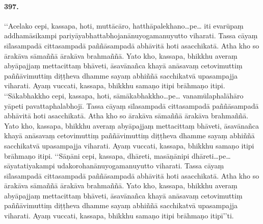 \paragraph{397.} ‘‘Acelako cepi, kassapa, hoti, muttācāro, hatthāpalekhano…pe… iti evarūpaṃ addhamāsikampi pariyāyabhattabhojanānuyogamanuyutto viharati. Tassa cāyaṃ sīlasampadā cittasampadā paññāsampadā abhāvitā hoti asacchikatā. Atha kho so ārakāva sāmaññā ārakāva brahmaññā. Yato kho, kassapa, bhikkhu averaṃ abyāpajjaṃ mettacittaṃ bhāveti, āsavānañca khayā anāsavaṃ cetovimuttiṃ paññāvimuttiṃ diṭṭheva dhamme sayaṃ abhiññā sacchikatvā upasampajja viharati. Ayaṃ vuccati, kassapa, bhikkhu samaṇo itipi brāhmaṇo itipi. ‘‘Sākabhakkho cepi, kassapa, hoti, sāmākabhakkho…pe… vanamūlaphalāhāro yāpeti pavattaphalabhojī. Tassa cāyaṃ sīlasampadā cittasampadā paññāsampadā abhāvitā hoti asacchikatā. Atha kho so ārakāva sāmaññā ārakāva brahmaññā. Yato kho, kassapa, bhikkhu averaṃ abyāpajjaṃ mettacittaṃ bhāveti, āsavānañca khayā anāsavaṃ cetovimuttiṃ paññāvimuttiṃ diṭṭheva dhamme sayaṃ abhiññā sacchikatvā upasampajja viharati. Ayaṃ vuccati, kassapa, bhikkhu samaṇo itipi brāhmaṇo itipi. ‘‘Sāṇāni cepi, kassapa, dhāreti, masāṇānipi dhāreti…pe… sāyatatiyakampi udakorohanānuyogamanuyutto viharati. Tassa cāyaṃ sīlasampadā cittasampadā paññāsampadā abhāvitā hoti asacchikatā. Atha kho so ārakāva sāmaññā ārakāva brahmaññā. Yato kho, kassapa, bhikkhu averaṃ abyāpajjaṃ mettacittaṃ bhāveti, āsavānañca khayā anāsavaṃ cetovimuttiṃ paññāvimuttiṃ diṭṭheva dhamme sayaṃ abhiññā sacchikatvā upasampajja viharati. Ayaṃ vuccati, kassapa, bhikkhu samaṇo itipi brāhmaṇo itipī’’ti.


